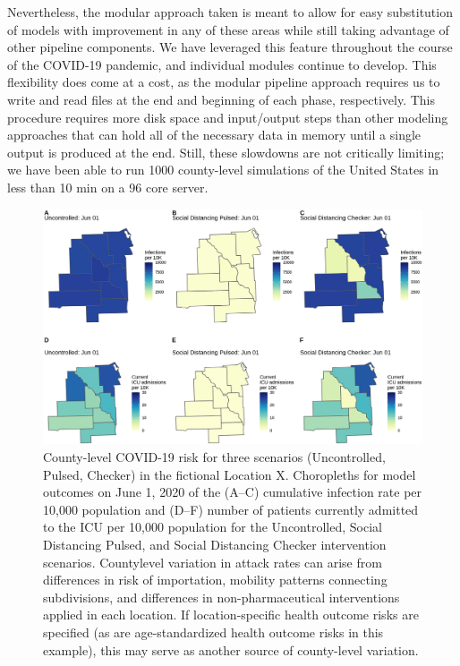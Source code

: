 Nevertheless, the modular approach taken is meant to allow for easy substitution of models with improvement in any of these areas while still taking advantage of other pipeline components. We have leveraged this feature throughout the course of the COVID-19 pandemic, and individual modules continue to develop. This flexibility does come at a cost, as the modular pipeline approach requires us to write and read files at the end and beginning of each phase, respectively. This procedure requires more disk space and input/output steps than other modeling approaches that can hold all of the necessary data in memory until a single output is produced at the end. Still, these slowdowns are not critically limiting; we have been able to run 1000 county-level simulations of the United States in less than 10 min on a 96 core server.
\begin{figure}[!htb]%
    \centering
    \includegraphics{fig_pipeline/fig4a}
    \caption[County-level COVID-19 risk for three scenarios.]{County-level COVID-19 risk for three scenarios (Uncontrolled, Pulsed, Checker) in the fictional Location X. Choropleths for model outcomes on June 1, 2020 of the (A–C) cumulative infection rate per 10,000 population and (D–F) number of patients currently admitted to the ICU per 10,000 population for the Uncontrolled, Social Distancing Pulsed, and Social Distancing Checker intervention scenarios. Countylevel variation in attack rates can arise from differences in risk of importation, mobility patterns connecting subdivisions, and differences in non-pharmaceutical interventions applied in each location. If location-specific health outcome risks are specified (as are age-standardized health outcome risks in this example), this may serve as another source of county-level variation.}
    \label{fig:pipeline-map}
\end{figure}

